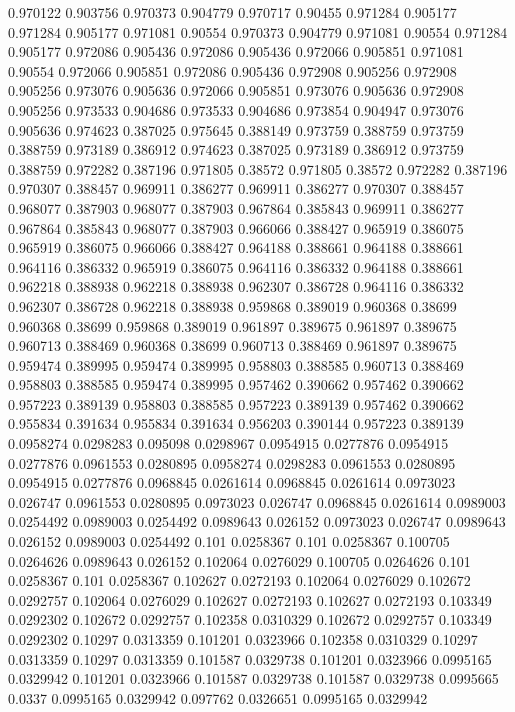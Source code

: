0.970122 0.903756
0.970373 0.904779
0.970717 0.90455
0.971284 0.905177
0.971284 0.905177
0.971081 0.90554
0.970373 0.904779
0.971081 0.90554
0.971284 0.905177
0.972086 0.905436
0.972086 0.905436
0.972066 0.905851
0.971081 0.90554
0.972066 0.905851
0.972086 0.905436
0.972908 0.905256
0.972908 0.905256
0.973076 0.905636
0.972066 0.905851
0.973076 0.905636
0.972908 0.905256
0.973533 0.904686
0.973533 0.904686
0.973854 0.904947
0.973076 0.905636
0.974623 0.387025
0.975645 0.388149
0.973759 0.388759
0.973759 0.388759
0.973189 0.386912
0.974623 0.387025
0.973189 0.386912
0.973759 0.388759
0.972282 0.387196
0.971805 0.38572
0.971805 0.38572
0.972282 0.387196
0.970307 0.388457
0.969911 0.386277
0.969911 0.386277
0.970307 0.388457
0.968077 0.387903
0.968077 0.387903
0.967864 0.385843
0.969911 0.386277
0.967864 0.385843
0.968077 0.387903
0.966066 0.388427
0.965919 0.386075
0.965919 0.386075
0.966066 0.388427
0.964188 0.388661
0.964188 0.388661
0.964116 0.386332
0.965919 0.386075
0.964116 0.386332
0.964188 0.388661
0.962218 0.388938
0.962218 0.388938
0.962307 0.386728
0.964116 0.386332
0.962307 0.386728
0.962218 0.388938
0.959868 0.389019
0.960368 0.38699
0.960368 0.38699
0.959868 0.389019
0.961897 0.389675
0.961897 0.389675
0.960713 0.388469
0.960368 0.38699
0.960713 0.388469
0.961897 0.389675
0.959474 0.389995
0.959474 0.389995
0.958803 0.388585
0.960713 0.388469
0.958803 0.388585
0.959474 0.389995
0.957462 0.390662
0.957462 0.390662
0.957223 0.389139
0.958803 0.388585
0.957223 0.389139
0.957462 0.390662
0.955834 0.391634
0.955834 0.391634
0.956203 0.390144
0.957223 0.389139
0.0958274 0.0298283
0.095098 0.0298967
0.0954915 0.0277876
0.0954915 0.0277876
0.0961553 0.0280895
0.0958274 0.0298283
0.0961553 0.0280895
0.0954915 0.0277876
0.0968845 0.0261614
0.0968845 0.0261614
0.0973023 0.026747
0.0961553 0.0280895
0.0973023 0.026747
0.0968845 0.0261614
0.0989003 0.0254492
0.0989003 0.0254492
0.0989643 0.026152
0.0973023 0.026747
0.0989643 0.026152
0.0989003 0.0254492
0.101 0.0258367
0.101 0.0258367
0.100705 0.0264626
0.0989643 0.026152
0.102064 0.0276029
0.100705 0.0264626
0.101 0.0258367
0.101 0.0258367
0.102627 0.0272193
0.102064 0.0276029
0.102672 0.0292757
0.102064 0.0276029
0.102627 0.0272193
0.102627 0.0272193
0.103349 0.0292302
0.102672 0.0292757
0.102358 0.0310329
0.102672 0.0292757
0.103349 0.0292302
0.10297 0.0313359
0.101201 0.0323966
0.102358 0.0310329
0.10297 0.0313359
0.10297 0.0313359
0.101587 0.0329738
0.101201 0.0323966
0.0995165 0.0329942
0.101201 0.0323966
0.101587 0.0329738
0.101587 0.0329738
0.0995665 0.0337
0.0995165 0.0329942
0.097762 0.0326651
0.0995165 0.0329942
